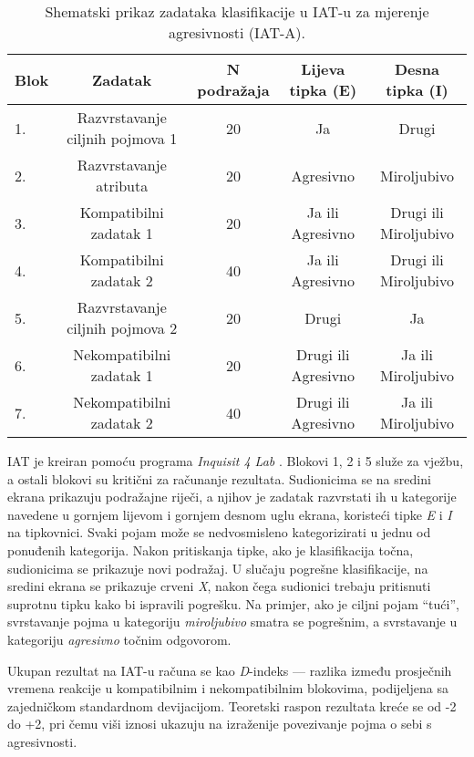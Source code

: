 \documentclass[a4paper, 12pt]{report}
\begin{document}
\begin{table}[h!]
    \centering
    \caption{\label{iata}Shematski prikaz zadataka klasifikacije u IAT-u za
        mjerenje agresivnosti (IAT-A).}
    \hspace*{-0.5cm}\begin{tabular}{l*{4}{c}}
        \toprule
        Blok & Zadatak & N podražaja & Lijeva tipka (E) & Desna tipka (I)\\
        \midrule
        1. & Razvrstavanje ciljnih pojmova 1& 20 & Ja & Drugi\\
        2. & Razvrstavanje atributa & 20 & Agresivno & Miroljubivo\\
        3. & Kompatibilni zadatak 1 & 20 & Ja ili Agresivno & Drugi ili Miroljubivo\\
        4. & Kompatibilni zadatak 2 & 40 & Ja ili Agresivno & Drugi ili Miroljubivo\\
        5. & Razvrstavanje ciljnih pojmova 2 & 20 & Drugi & Ja\\
        6. & Nekompatibilni zadatak 1 & 20 & Drugi ili Agresivno & Ja ili Miroljubivo\\
        7. & Nekompatibilni zadatak 2 & 40 & Drugi ili Agresivno & Ja ili Miroljubivo\\
        \bottomrule
    \end{tabular}
\end{table}

IAT je kreiran pomoću programa \emph{Inquisit 4 Lab} \citep{inq}. 
Blokovi 1, 2 i 5 služe za vježbu, a ostali blokovi su kritični za
računanje rezultata. Sudionicima se na sredini ekrana prikazuju podražajne
riječi, a njihov je zadatak razvrstati ih u kategorije navedene u gornjem
lijevom i gornjem desnom uglu ekrana, koristeći tipke \emph{E} i \emph{I} na
tipkovnici. Svaki pojam može se nedvosmisleno kategorizirati u jednu od
ponuđenih kategorija. Nakon pritiskanja tipke, ako je klasifikacija točna,
sudionicima se prikazuje novi podražaj. U slučaju pogrešne klasifikacije, na
sredini ekrana se prikazuje crveni \emph{X}, nakon čega sudionici trebaju
pritisnuti suprotnu tipku kako bi ispravili pogrešku. Na primjer, ako je ciljni
pojam \enquote{tući}, svrstavanje pojma u kategoriju \textit{miroljubivo} smatra
se pogrešnim, a svrstavanje u kategoriju \textit{agresivno} točnim odgovorom.

Ukupan rezultat na IAT-u računa se kao \emph{D}-indeks ---
razlika između prosječnih vremena reakcije u kompatibilnim i nekompatibilnim
blokovima, podijeljena sa zajedničkom standardnom devijacijom.
Teoretski raspon rezultata kreće se od -2 do +2, pri čemu viši iznosi ukazuju na
izraženije povezivanje pojma o sebi s agresivnosti.
\end{document}
